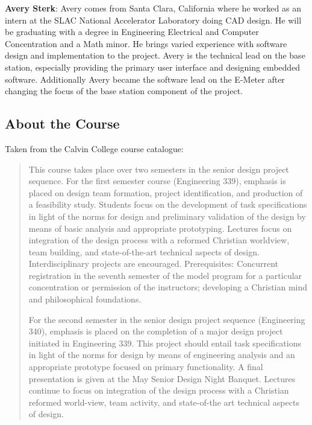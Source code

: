 \textbf{Avery Sterk}: Avery comes from Santa Clara, California where he worked as an intern at the SLAC National Accelerator Laboratory doing CAD design. He will be graduating with a degree in Engineering Electrical and Computer Concentration and a Math minor. He brings varied experience with software design and implementation to the project. Avery is the technical lead on the base station, especially providing the primary user interface and designing embedded software. Additionally Avery became the software lead on the E-Meter after changing the focus of the base station component of the project.
 
\subsection{About the Course}
Taken from the Calvin College course catalogue:
\begin{quote}
This course takes place over two semesters in the senior design project sequence. For the first semester course (Engineering 339), emphasis is placed on design team formation, project identification, and production of a feasibility study. Students focus on the development of task specifications in light of the norms for design and preliminary validation of the design by means of basic analysis and appropriate prototyping. Lectures focus on integration of the design process with a reformed Christian worldview, team building, and state-of-the-art technical aspects of design. Interdisciplinary projects are encouraged. Prerequisites: Concurrent registration in the seventh semester of the model program for a particular concentration or permission of the instructors; developing a Christian mind and philosophical foundations.

For the second semester in the senior design project sequence (Engineering 340), emphasis is placed on the completion of a major design project initiated in Engineering 339. This project should entail task specifications in light of the norms for design by means of engineering analysis and an appropriate prototype focused on primary functionality. A final presentation is given at the May Senior Design Night Banquet. Lectures continue to focus on integration of the design process with a Christian reformed world-view, team activity, and state-of-the art technical aspects of design.
\end{quote}